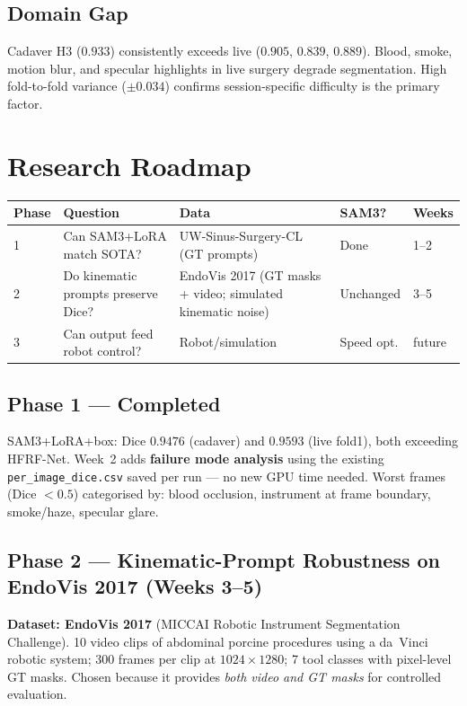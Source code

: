 \documentclass[11pt, a4paper]{article}
\begin{document}
\subsection{Domain Gap}
Cadaver H3 ($0.933$) consistently exceeds live ($0.905$, $0.839$, $0.889$).
Blood, smoke, motion blur, and specular highlights in live surgery degrade
segmentation. High fold-to-fold variance ($\pm0.034$) confirms session-specific
difficulty is the primary factor.

\section{Research Roadmap}

\begin{center}
\begin{tabular}{C{1cm} C{4.5cm} C{4cm} C{2.8cm} C{1.2cm}}
\toprule
\textbf{Phase} & \textbf{Question} & \textbf{Data} & \textbf{SAM3?} & \textbf{Weeks} \\
 & Can SAM3+LoRA match SOTA? & UW-Sinus-Surgery-CL (GT prompts) & Done & 1--2 \\
2 & Do kinematic prompts preserve Dice? & EndoVis 2017 (GT masks + video; simulated kinematic noise) & Unchanged & 3--5 \\
3 & Can output feed robot control? & Robot/simulation & Speed opt. & future \\
\bottomrule
\end{tabular}
\end{center}

\subsection{Phase 1 --- Completed}
SAM3+LoRA+box: Dice $0.9476$ (cadaver) and $0.9593$ (live fold1), both exceeding
HFRF-Net. Week~2 adds \textbf{failure mode analysis} using the existing
\texttt{per\_image\_dice.csv} saved per run --- no new GPU time needed.
Worst frames (Dice $<0.5$) categorised by: blood occlusion, instrument at
frame boundary, smoke/haze, specular glare.

\subsection{Phase 2 --- Kinematic-Prompt Robustness on EndoVis 2017 (Weeks 3--5)}

\textbf{Dataset: EndoVis 2017} (MICCAI Robotic Instrument Segmentation Challenge).
10 video clips of abdominal porcine procedures using a da~Vinci robotic system;
300 frames per clip at $1024\times1280$; 7 tool classes with pixel-level GT masks.
Chosen because it provides \textit{both video and GT masks} for controlled evaluation.
\end{document}
